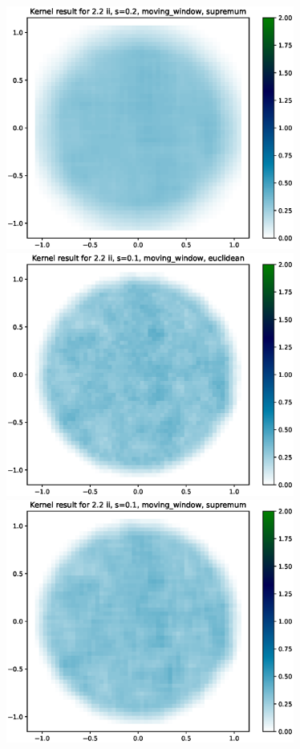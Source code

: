 \documentclass{article}
\begin{document}
\includegraphics[height=8cm]{comparisons//Kernel_result_2-2ii_s_0-2_moving_window_supremum.eps} \\
\hspace*{-1.5cm}\includegraphics[height=8cm]{comparisons//Kernel_result_2-2ii_s_0-1_moving_window_euclidean.eps} \hspace*{-1.5cm}
\includegraphics[height=8cm]{comparisons//Kernel_result_2-2ii_s_0-1_moving_window_supremum.eps}\\
\end{document}
